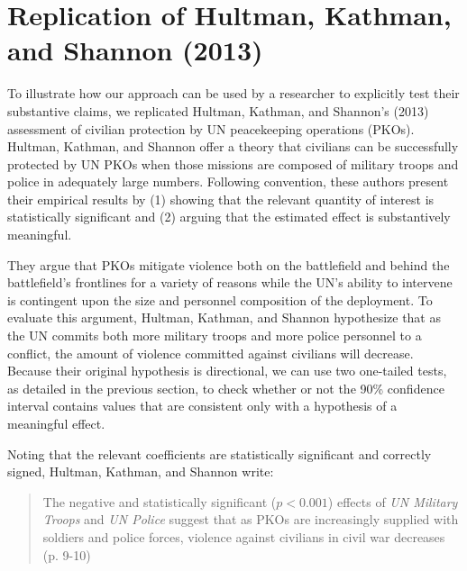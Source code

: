 \documentclass[12pt]{article}
\begin{document}


\section*{Replication of Hultman, Kathman, and Shannon (2013)}

To illustrate how our approach can be used by a researcher to explicitly test their substantive claims, we replicated Hultman, Kathman, and Shannon's (2013) assessment of civilian protection by UN peacekeeping operations (PKOs). Hultman, Kathman, and Shannon offer a theory that civilians can be successfully protected by UN PKOs when those missions are composed of military troops and police in adequately large numbers. Following convention, these authors present their empirical results by (1) showing that the relevant quantity of interest is statistically significant and (2) arguing that the estimated effect is substantively meaningful.

They argue that PKOs mitigate violence both on the battlefield and behind the battlefield's frontlines for a variety of reasons while the UN's ability to intervene is contingent upon the size and personnel composition of the deployment. To evaluate this argument, Hultman, Kathman, and Shannon hypothesize that as the UN commits both more military troops and more police personnel to a conflict, the amount of violence committed against civilians will decrease. Because their original hypothesis is directional, we can use two one-tailed tests, as detailed in the previous section, to check whether or not the 90\% confidence interval contains values that are consistent only with a hypothesis of a meaningful effect. 

Noting that the relevant coefficients are statistically significant and correctly signed, Hultman, Kathman, and Shannon write:

\begin{quote}
The negative and statistically significant ($p < 0.001$) effects of \textit{UN Military Troops} and \textit{UN Police} suggest that as PKOs are increasingly supplied with soldiers and police forces, violence against civilians in civil war decreases (p. 9-10)
\end{quote}
\end{document}
